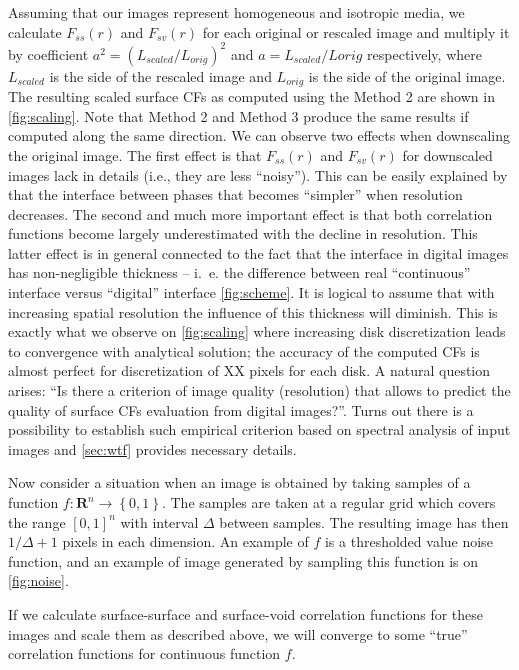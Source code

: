 \documentclass[reprint,amsmath,amssymb,aps,pre]{revtex4-1}
\begin{document}
Assuming that our images represent homogeneous and isotropic media, we calculate
$F_{ss}(r)$ and $F_{sv}(r)$ for each original or rescaled image and multiply it
by coefficient $a^2 = (L_{scaled}/L_{orig})^2$ and $a = L_{scaled}/L{orig}$
respectively, where $L_{scaled}$ is the side of the rescaled image and
$L_{orig}$ is the side of the original image. The resulting scaled surface CFs
as computed using the Method 2 are shown in \cref{fig:scaling}. Note that
Method 2 and Method 3 produce the same results if computed along the same
direction. We can observe two effects when downscaling the original image. The
first effect is that $F_{ss}(r)$ and $F_{sv}(r)$ for downscaled images lack in
details (i.e., they are less ``noisy''). This can be easily explained by that the
interface between phases that becomes ``simpler'' when resolution decreases. The
second and much more important effect is that both correlation functions become
largely underestimated with the decline in resolution. This latter effect is in
general connected to the fact that the interface in digital images has
non-negligible thickness -- i.~e. the difference between real ``continuous''
interface versus ``digital'' interface \cref{fig:scheme}. It is logical to
assume that with increasing spatial resolution the influence of this thickness
will diminish. This is exactly what we observe on \cref{fig:scaling} where
increasing disk discretization leads to convergence with analytical solution;
the accuracy of the computed CFs is almost perfect for discretization of XX
pixels for each disk. A natural question arises: ``Is there a criterion of image
quality (resolution) that allows to predict the quality of surface CFs
evaluation from digital images?''. Turns out there is a possibility to establish
such empirical criterion based on spectral analysis of input images and
\cref{sec:wtf} provides necessary details.

Now consider a situation when an image is obtained by taking samples of a function
$f: \mathbf{R}^n \rightarrow \left\{0, 1\right\}$. The samples are taken at a regular grid
which covers the range $[0, 1]^n$  with interval $\Delta$ between samples. The
resulting image has then $1/\Delta + 1$ pixels in each dimension. An example of
$f$ is a thresholded value noise function, and an example of image generated by
sampling this function is on \cref{fig:noise}.

If we calculate surface-surface and surface-void correlation functions for these
images and scale them as described above, we will converge to some ``true''
correlation functions for continuous function $f$.
\end{document}
